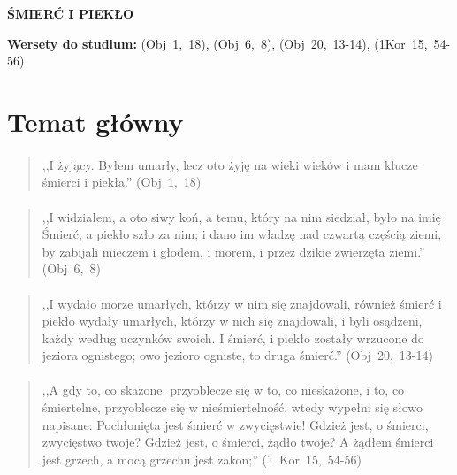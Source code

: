 \documentclass[10pt,a4paper,oneside]{article}
\begin{document}
\centerline{\textbf{\MakeUppercase{Śmierć i Piekło}}}
\begin{center}
\textbf{Wersety do studium:} 
\mbox{(Obj 1, 18)}, \mbox{(Obj 6, 8)}, \mbox{(Obj 20, 13-14)}, \mbox{(1Kor 15, 54-56)}
\end{center}
\section{Temat główny}
\paragraph{}
\begin{quote}
,,I żyjący. Byłem umarły, lecz oto żyję na wieki wieków i mam klucze śmierci i piekła.'' \mbox{(Obj 1, 18)}
\end{quote}
\paragraph{}
\begin{quote}
,,I widziałem, a oto siwy koń, a temu, który na nim siedział, było na imię Śmierć, a piekło szło za nim; i dano im władzę nad czwartą częścią ziemi, by zabijali mieczem i głodem, i morem, i przez dzikie zwierzęta ziemi.'' \mbox{(Obj 6, 8)}
\end{quote}
\paragraph{}
\begin{quote}
,,I wydało morze umarłych, którzy w nim się znajdowali, również śmierć i piekło wydały umarłych, którzy w nich się znajdowali, i byli osądzeni, każdy według uczynków swoich. I śmierć, i piekło zostały wrzucone do jeziora ognistego; owo jezioro ogniste, to druga śmierć.'' \mbox{(Obj 20, 13-14)}
\end{quote}
\paragraph{}
\begin{quote}
,,A gdy to, co skażone, przyoblecze się w to, co nieskażone, i to, co śmiertelne, przyoblecze się w nieśmiertelność, wtedy wypełni się słowo napisane: Pochłonięta jest śmierć w zwycięstwie! Gdzież jest, o śmierci, zwycięstwo twoje? Gdzież jest, o śmierci, żądło twoje? A żądłem śmierci jest grzech, a mocą grzechu jest zakon;'' \mbox{(1 Kor 15, 54-56)}
\end{quote}
\end{document}
